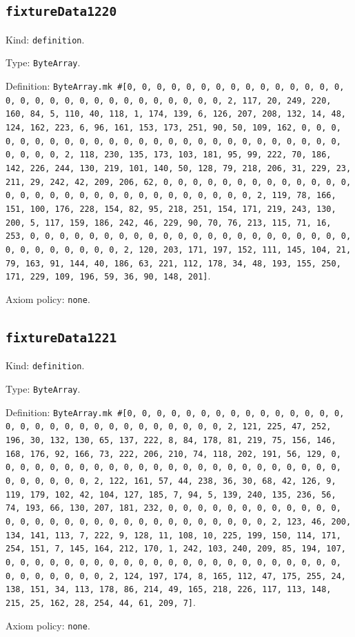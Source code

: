 \documentclass[11pt]{article}
\begin{document}
\subsection*{\texttt{fixtureData1220}}
\noindent Kind: \texttt{definition}.\par
\noindent Type: \texttt{ByteArray}.\par
\noindent Definition: \texttt{ByteArray.mk \#[0, 0, 0, 0, 0, 0, 0, 0, 0, 0, 0, 0, 0, 0, 0, 0, 0, 0, 0, 0, 0, 0, 0, 0, 0, 0, 0, 0, 0, 0, 2, 117, 20, 249, 220, 160, 84, 5, 110, 40, 118, 1, 174, 139, 6, 126, 207, 208, 132, 14, 48, 124, 162, 223, 6, 96, 161, 153, 173, 251, 90, 50, 109, 162, 0, 0, 0, 0, 0, 0, 0, 0, 0, 0, 0, 0, 0, 0, 0, 0, 0, 0, 0, 0, 0, 0, 0, 0, 0, 0, 0, 0, 0, 0, 2, 118, 230, 135, 173, 103, 181, 95, 99, 222, 70, 186, 142, 226, 244, 130, 219, 101, 140, 50, 128, 79, 218, 206, 31, 229, 23, 211, 29, 242, 42, 209, 206, 62, 0, 0, 0, 0, 0, 0, 0, 0, 0, 0, 0, 0, 0, 0, 0, 0, 0, 0, 0, 0, 0, 0, 0, 0, 0, 0, 0, 0, 0, 0, 2, 119, 78, 166, 151, 100, 176, 228, 154, 82, 95, 218, 251, 154, 171, 219, 243, 130, 200, 5, 117, 159, 186, 242, 46, 229, 90, 70, 76, 213, 115, 71, 16, 253, 0, 0, 0, 0, 0, 0, 0, 0, 0, 0, 0, 0, 0, 0, 0, 0, 0, 0, 0, 0, 0, 0, 0, 0, 0, 0, 0, 0, 0, 0, 2, 120, 203, 171, 197, 152, 111, 145, 104, 21, 79, 163, 91, 144, 40, 186, 63, 221, 112, 178, 34, 48, 193, 155, 250, 171, 229, 109, 196, 59, 36, 90, 148, 201]}.\par
\noindent Axiom policy: \texttt{none}.\par
\subsection*{\texttt{fixtureData1221}}
\noindent Kind: \texttt{definition}.\par
\noindent Type: \texttt{ByteArray}.\par
\noindent Definition: \texttt{ByteArray.mk \#[0, 0, 0, 0, 0, 0, 0, 0, 0, 0, 0, 0, 0, 0, 0, 0, 0, 0, 0, 0, 0, 0, 0, 0, 0, 0, 0, 0, 0, 0, 2, 121, 225, 47, 252, 196, 30, 132, 130, 65, 137, 222, 8, 84, 178, 81, 219, 75, 156, 146, 168, 176, 92, 166, 73, 222, 206, 210, 74, 118, 202, 191, 56, 129, 0, 0, 0, 0, 0, 0, 0, 0, 0, 0, 0, 0, 0, 0, 0, 0, 0, 0, 0, 0, 0, 0, 0, 0, 0, 0, 0, 0, 0, 0, 2, 122, 161, 57, 44, 238, 36, 30, 68, 42, 126, 9, 119, 179, 102, 42, 104, 127, 185, 7, 94, 5, 139, 240, 135, 236, 56, 74, 193, 66, 130, 207, 181, 232, 0, 0, 0, 0, 0, 0, 0, 0, 0, 0, 0, 0, 0, 0, 0, 0, 0, 0, 0, 0, 0, 0, 0, 0, 0, 0, 0, 0, 0, 0, 2, 123, 46, 200, 134, 141, 113, 7, 222, 9, 128, 11, 108, 10, 225, 199, 150, 114, 171, 254, 151, 7, 145, 164, 212, 170, 1, 242, 103, 240, 209, 85, 194, 107, 0, 0, 0, 0, 0, 0, 0, 0, 0, 0, 0, 0, 0, 0, 0, 0, 0, 0, 0, 0, 0, 0, 0, 0, 0, 0, 0, 0, 0, 0, 2, 124, 197, 174, 8, 165, 112, 47, 175, 255, 24, 138, 151, 34, 113, 178, 86, 214, 49, 165, 218, 226, 117, 113, 148, 215, 25, 162, 28, 254, 44, 61, 209, 7]}.\par
\noindent Axiom policy: \texttt{none}.\par
\end{document}
